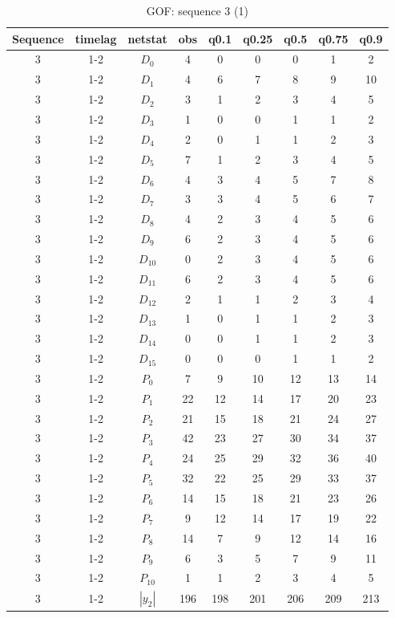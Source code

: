 \documentclass[a4paper, 11pt]{report}
\theoremstyle{definition}
\begin{document}
\begin{table}[h!]
    \centering
        \begin{tabular}{c| c | c | c | c |c |c |c |c }
            Sequence& timelag & netstat & obs & q0.1 & q0.25 & q0.5 & q0.75 & q0.9 \\
            \hline \hline
            3 & 1-2 & $D_0$ & 4 &  0& 0& 0& 1& 2 \\
            3 & 1-2 & $D_1$ & 4 &  6& 7& 8& 9& 10 \\
            3 & 1-2 & $D_2$ & 3 &  1& 2& 3& 4& 5 \\
            3 & 1-2 & $D_3$ & 1 &  0& 0& 1& 1& 2 \\
            3 & 1-2 & $D_4$ & 2 &  0& 1& 1& 2& 3 \\
            3 & 1-2 & $D_5$ & 7 &  1& 2& 3& 4& 5 \\
            3 & 1-2 & $D_6$ & 4 &  3& 4& 5& 7& 8 \\
            3 & 1-2 & $D_7$ & 3 &  3& 4& 5& 6& 7 \\
            3 & 1-2 & $D_8$ & 4 &  2& 3& 4& 5& 6 \\
            3 & 1-2 & $D_9$ & 6 &  2& 3& 4& 5& 6 \\
            3 & 1-2 & $D_{10}$ & 0 &  2& 3& 4& 5& 6 \\
            3 & 1-2 & $D_{11}$ & 6 &  2& 3& 4& 5& 6 \\
            3 & 1-2 & $D_{12}$ & 2 &  1& 1& 2& 3& 4 \\
            3 & 1-2 & $D_{13}$ & 1 &  0& 1& 1& 2& 3 \\
            3 & 1-2 & $D_{14}$ & 0 &  0& 1& 1& 2& 3 \\
            3 & 1-2 & $D_{15}$ & 0 &  0& 0& 1& 1& 2 \\
            3 & 1-2 & $P_0$ & 7 & 9& 10& 12& 13& 14 \\
            3 & 1-2 & $P_1$ & 22 & 12& 14& 17& 20& 23 \\
            3 & 1-2 & $P_2$ & 21 & 15& 18& 21& 24& 27 \\
            3 & 1-2 & $P_3$ & 42 & 23& 27& 30& 34& 37 \\
            3 & 1-2 & $P_4$ & 24 & 25& 29& 32& 36& 40 \\
            3 & 1-2 & $P_5$ & 32 & 22& 25& 29& 33& 37 \\
            3 & 1-2 & $P_6$ & 14 & 15& 18& 21& 23& 26 \\
            3 & 1-2 & $P_7$ & 9 & 12& 14& 17& 19& 22 \\
            3 & 1-2 & $P_8$ & 14 & 7& 9& 12& 14& 16 \\
            3 & 1-2 & $P_9$ & 6 &  3& 5& 7& 9& 11 \\
            3 & 1-2 & $P_10$ & 1 &  1& 2& 3& 4& 5 \\
            3 & 1-2 & $|y_2|$ & 196 &  198& 201& 206& 209& 213 \\
        \end{tabular}
        \caption{GOF: sequence 3 (1)}
    \end{table}
\end{document}
